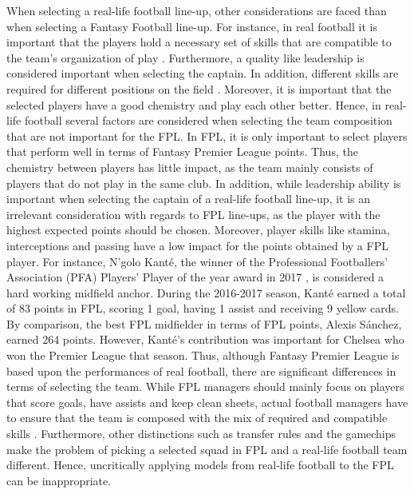 \newpar

When selecting a real-life football line-up, other considerations are faced than when selecting a Fantasy Football line-up. For instance, in real football it is important that the players hold a necessary set of skills that are compatible to the team's organization of play \citep{Pantuso}. Furthermore, a quality like leadership is considered important when selecting the captain. In addition, different skills are required for different positions on the field \citep{Boon}. Moreover, it is important that the selected players have a good chemistry and play each other better. Hence, in real-life football several factors are considered when selecting the team composition that are not important for the FPL. In FPL, it is only important to select players that perform well in terms of Fantasy Premier League points. Thus, the chemistry between players has little impact, as the team mainly consists of players that do not play in the same club. In addition, while leadership ability is important when selecting the captain of a real-life football line-up, it is an irrelevant consideration with regards to FPL line-ups, as the player with the highest expected points should be chosen. Moreover, player skills like stamina, interceptions and passing have a low impact for the points obtained by a FPL player. For instance, N'golo Kant\'e, the winner of the Professional Footballers' Association (PFA) Players' Player of the year award in 2017 \citep{Skysports_Kante}, is considered a hard working midfield anchor. During the 2016-2017 season, Kant\'e earned a total of 83 points in FPL, scoring 1 goal, having 1 assist and receiving 9 yellow cards. By comparison, the best FPL midfielder in terms of FPL points, Alexis Sánchez, earned 264 points. However, Kant\'e's contribution was important for Chelsea who won the Premier League that season. Thus, although Fantasy Premier League is based upon the performances of real football, there are significant differences in terms of selecting the team. While FPL managers should mainly focus on players that score goals, have assists and keep clean sheets, actual football managers have to ensure that the team is composed with the mix of required and compatible skills \citep{Pantuso}. Furthermore, other distinctions such as transfer rules and the gamechips make the problem of picking a selected squad in FPL and a real-life football team different. Hence, uncritically applying models from real-life football to the FPL can be inappropriate.




